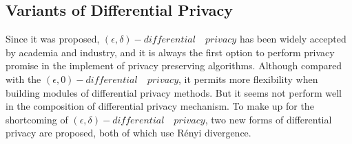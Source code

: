 \documentclass[conference]{IEEEtran}
\begin{document}
\subsection{Variants of Differential Privacy}
Since it was proposed, $(\epsilon, \delta)-differential \quad privacy$ has been widely accepted by academia and industry, and it is always the first option to perform privacy promise in the implement of privacy preserving algorithms. Although compared with the $(\epsilon, 0)-differential \quad privacy$, it permits more flexibility when building modules of differential privacy methods. But it seems not perform well in the composition of differential privacy mechanism. To make up for the shortcoming of $(\epsilon, \delta)-differential \quad privacy$, two new forms of differential privacy are proposed, both of which use Rényi divergence.
\end{document}
